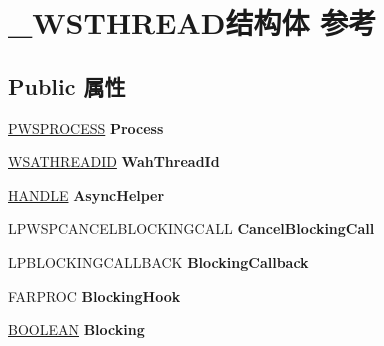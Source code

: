 \hypertarget{struct___w_s_t_h_r_e_a_d}{}\section{\+\_\+\+W\+S\+T\+H\+R\+E\+A\+D结构体 参考}
\label{struct___w_s_t_h_r_e_a_d}
\subsection*{Public 属性}
\begin{DoxyCompactItemize}
\item 
\mbox{\label{struct___w_s_t_h_r_e_a_d_a3db9755fffdade431698bf58550a775d}} 
\hyperlink{struct___w_s_p_r_o_c_e_s_s}{P\+W\+S\+P\+R\+O\+C\+E\+SS} {\bfseries Process}
\item 
\mbox{\label{struct___w_s_t_h_r_e_a_d_aca1a65c7b398d73c78b641bb71ca730b}} 
\hyperlink{struct___w_s_a_t_h_r_e_a_d_i_d}{W\+S\+A\+T\+H\+R\+E\+A\+D\+ID} {\bfseries Wah\+Thread\+Id}
\item 
\mbox{\label{struct___w_s_t_h_r_e_a_d_abfdd0a5e7a9a1f1642eb7477f50893bb}} 
\hyperlink{interfacevoid}{H\+A\+N\+D\+LE} {\bfseries Async\+Helper}
\item 
\mbox{\label{struct___w_s_t_h_r_e_a_d_a2a35587e9df86a1287902a61a51c3cf2}} 
L\+P\+W\+S\+P\+C\+A\+N\+C\+E\+L\+B\+L\+O\+C\+K\+I\+N\+G\+C\+A\+LL {\bfseries Cancel\+Blocking\+Call}
\item 
\mbox{\label{struct___w_s_t_h_r_e_a_d_a515bbd9cee3b3cb504333efab8333e04}} 
L\+P\+B\+L\+O\+C\+K\+I\+N\+G\+C\+A\+L\+L\+B\+A\+CK {\bfseries Blocking\+Callback}
\item 
\mbox{\label{struct___w_s_t_h_r_e_a_d_a66aa4a38b5c4c55f5e4a554d74d26766}} 
F\+A\+R\+P\+R\+OC {\bfseries Blocking\+Hook}
\item 
\mbox{\label{struct___w_s_t_h_r_e_a_d_a06c0853698897e250a1c454b4117ef82}} 
\hyperlink{_processor_bind_8h_a112e3146cb38b6ee95e64d85842e380a}{B\+O\+O\+L\+E\+AN} {\bfseries Blocking}
\item 

\end{DoxyCompactItemize}
